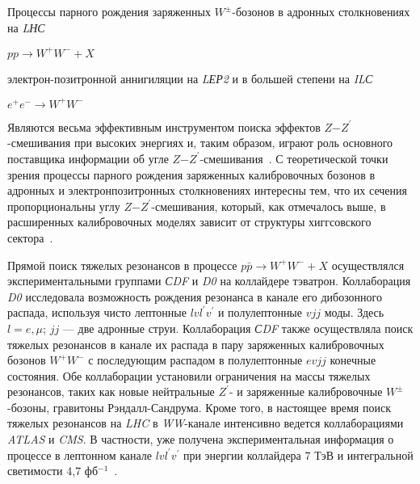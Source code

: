 Процессы парного рождения заряженных $W^±$-бозонов в адронных столкновениях на \textit{LНС}
\begin{center}
	$pp \rightarrow W^+W^- + X$
\end{center}
электрон-позитронной аннигиляции на \textit{LЕР2} и в большей степени на \textit{ILС}
\begin{center}
	$e^+e^- \rightarrow W^+W^-$
\end{center}

Являются весьма эффективным инструментом поиска эффектов $Z$−$Z^\prime$-смешивания при высоких энергиях и, таким образом, играют роль основного поставщика информации об угле $Z$−$Z^\prime$-смешивания~\cite{Bobovnikov:2016}. С теоретической точки зрения процессы парного рождения заряженных калибровочных бозонов в адронных и электронпозитронных столкновениях интересны тем, что их сечения пропорциональны углу $Z$−$Z^\prime$-смешивания, который, как отмечалось выше, в расширенных калибровочных моделях зависит от структуры хиггсовского сектора~\cite{sirunyan:2017}.

Прямой поиск тяжелых резонансов в процессе $p\bar{p} \rightarrow W^+W^- + X$ осуществлялся экспериментальными группами \textit{СDF} и \textit{D0} на коллайдере тэватрон. Коллаборация \textit{D0} исследовала возможность рождения резонанса в канале его дибозонного распада, используя чисто лептонные $lvl^\prime v^\prime$ и полулептонные $vjj$ моды. Здесь $l=e,\mu$; $jj$ — две адронные струи. Коллаборация \textit{СDF} также осуществляла поиск тяжелых резонансов в канале их распада в пару заряженных калибровочных бозонов $W^+W^−$ с последующим распадом в полулептонные $evjj$ конечные состояния. Обе коллаборации установили ограничения на массы тяжелых резонансов, таких как новые нейтральные $Z^\prime$- и заряженные калибровочные $W^±$-бозоны, гравитоны Рэндалл-Сандрума. Кроме того, в настоящее время поиск тяжелых резонансов на \textit{LHC} в \textit{WW}-канале интенсивно ведется коллаборациями \textit{ATLAS} и \textit{CMS}. В частности, уже получена экспериментальная информация о процессе в лептонном канале $lvl^\prime v^\prime$ при энергии коллайдера 7 ТэВ и интегральной светимости 4,7 фб${}^{−1}$~\cite{2part-pankov}.

